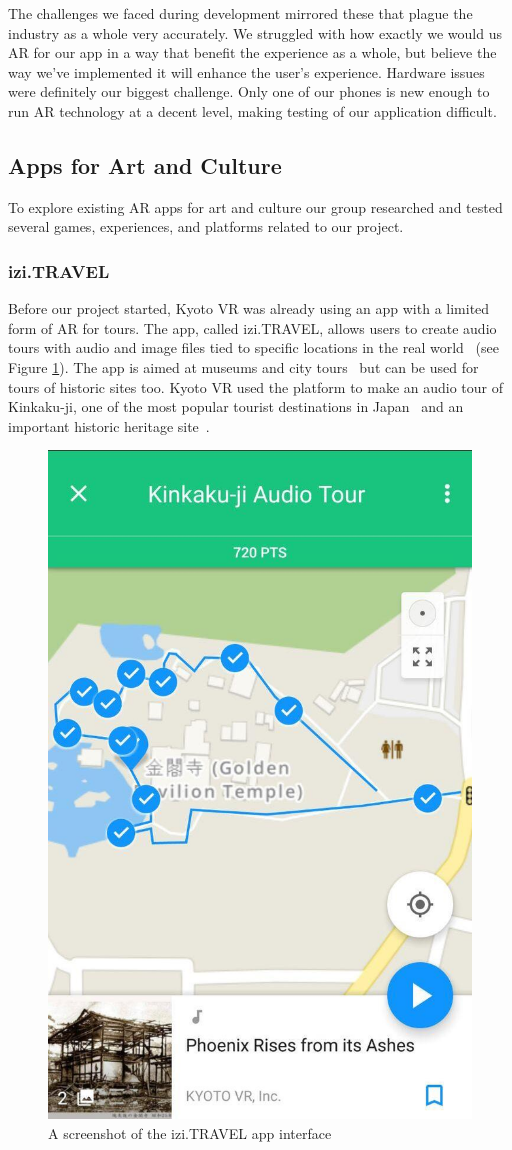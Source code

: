 \documentclass[a4paper, 10pt, american, titlepage]{article}
\begin{document}
The challenges we faced during development mirrored these that plague the industry
as a whole very accurately. We struggled with how exactly we would us AR for our app
in a way that benefit the experience as a whole, but believe the way we've implemented
it will enhance the user's experience. Hardware issues were definitely our biggest challenge.
Only one of our phones is new enough to run AR technology at a decent level, making
testing of our application difficult.  

\subsection{Apps for Art and Culture}
\label{sec:appsForArtAndCulture}

To explore existing AR apps for art and culture our group researched and tested
several games, experiences, and platforms related to our project.

\subsubsection{izi.TRAVEL}
\label{sec:iziTravel}

Before our project started, Kyoto VR was already using an app with a limited
form of AR for tours. The app, called izi.TRAVEL, allows users to create audio
tours with audio and image files tied to specific locations in the real
world~\autocite{izitravel2015} (see Figure \ref{fig:iziTravel}). The app is
aimed at museums and city tours~\autocite{izitravel} but can be used for tours
of historic sites too.  Kyoto VR used the platform to make an audio tour of
Kinkaku-ji, one of the most popular tourist destinations in
Japan~\autocite{bornoff2000} and an important historic heritage
site~\autocite{unesco}.


\begin{figure}[h]
	\centering
	\includegraphics[width=.5\textwidth]{izi-travel.jpg}
	\caption{A screenshot of the izi.TRAVEL app interface}
	\label{fig:iziTravel}
\end{figure}
\end{document}

